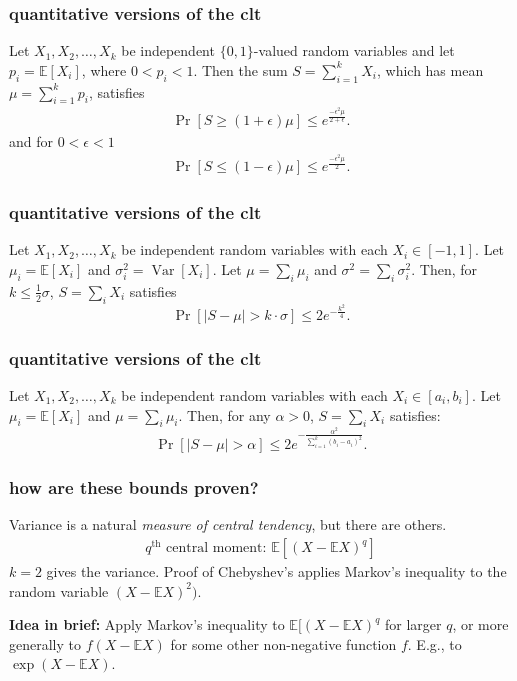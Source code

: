 \documentclass[compress]{beamer}
\newcommand{\E}{\mathbb{E}}
\DeclareMathOperator{\Var}{Var}
\begin{document}
\begin{frame}
	\frametitle{quantitative versions of the clt}
	\begin{theorem}
		Let $X_1,X_2,\ldots,X_k$ be independent $\{0,1\}$-valued random variables and let
		$p_i = \E[X_i]$, where $0<p_i<1$.
		Then the sum $S = \sum_{i=1}^{k} X_i$, which has mean
		$\mu = \sum_{i=1}^{k} p_i$, satisfies
		\begin{align*}
			\Pr[S \geq (1+\epsilon)\mu] \leq e^{\frac{-\epsilon^2\mu}{2+ \epsilon}}.
		\end{align*}
		and for $0<\epsilon <1$
		\begin{align*}
			\Pr[S \leq (1-\epsilon)\mu] \leq e^{\frac{-\epsilon^2\mu}{2}}.
		\end{align*}
	\end{theorem} 
\end{frame}

\begin{frame}
	\frametitle{quantitative versions of the clt}
	\begin{theorem}
		Let $X_1, X_2, \ldots, X_k$ be independent random variables with each $X_i \in [-1,1]$.
		Let $\mu_i =\E[X_i]$ and $\sigma_i^2 = \Var[X_i]$. Let  $\mu =\sum_i \mu_i$ and $\sigma^2 =\sum_i \sigma_i^2$. Then, for $k \leq \frac{1}{2}\sigma$, $S =\sum_i X_i$ satisfies
		$$\Pr[|S - \mu| > k\cdot \sigma] \leq  2 e^{-\frac{k^2}{4}}.$$
	\end{theorem}
\end{frame}

\begin{frame}
	\frametitle{quantitative versions of the clt}
	\begin{theorem}
		Let $X_1, X_2, \ldots, X_k$ be independent random variables with each $X_i \in [a_i,b_i]$.
		Let $\mu_i =\E[X_i]$ and $\mu =\sum_i \mu_i$. Then, for any $\alpha > 0$, $S =\sum_i X_i$ satisfies:
		$$\Pr[|S - \mu| > \alpha] \leq  2 e^{-\frac{\alpha^2}{\sum_{i=1}^k (b_i-a_i)^2}}.$$
	\end{theorem}
\end{frame}

\begin{frame}
	\frametitle{how are these bounds proven?}
	Variance is a natural \emph{measure of central tendency}, but there are others. 
	\begin{align*}
		q^\text{th} \text{ central moment: } \E[(X-\E X)^q]
	\end{align*}
	$k = 2$ gives the variance. Proof of Chebyshev's applies Markov's inequality to the random variable $(X - \E X)^2)$.
	
	\textbf{Idea in brief:} Apply Markov's inequality to $\E[(X-\E X)^q$ for larger $q$, or more generally to $f(X-\E X)$ for some other non-negative function $f$. E.g., to $\exp(X-\E X)$. 
\end{frame}
\end{document}
